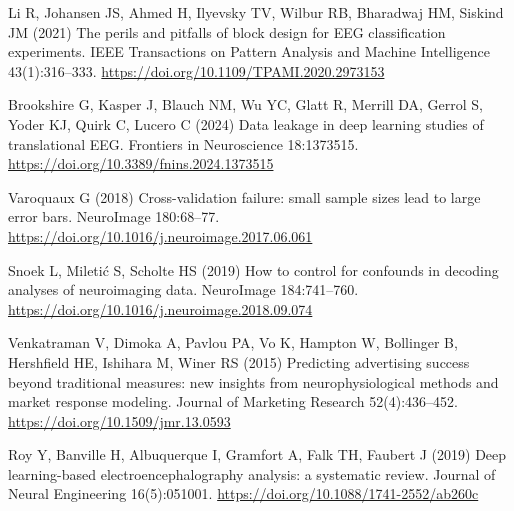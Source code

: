 
 Li R, Johansen JS, Ahmed H, Ilyevsky TV, Wilbur RB, Bharadwaj HM, Siskind JM (2021) The perils and pitfalls of block design for EEG classification experiments. IEEE Transactions on Pattern Analysis and Machine Intelligence 43(1):316--333. \url{https://doi.org/10.1109/TPAMI.2020.2973153}

 Brookshire G, Kasper J, Blauch NM, Wu YC, Glatt R, Merrill DA, Gerrol S, Yoder KJ, Quirk C, Lucero C (2024) Data leakage in deep learning studies of translational EEG. Frontiers in Neuroscience 18:1373515. \url{https://doi.org/10.3389/fnins.2024.1373515}

 Varoquaux G (2018) Cross-validation failure: small sample sizes lead to large error bars. NeuroImage 180:68--77. \url{https://doi.org/10.1016/j.neuroimage.2017.06.061}

 Snoek L, Mileti\'{c} S, Scholte HS (2019) How to control for confounds in decoding analyses of neuroimaging data. NeuroImage 184:741--760. \url{https://doi.org/10.1016/j.neuroimage.2018.09.074}

 Venkatraman V, Dimoka A, Pavlou PA, Vo K, Hampton W, Bollinger B, Hershfield HE, Ishihara M, Winer RS (2015) Predicting advertising success beyond traditional measures: new insights from neurophysiological methods and market response modeling. Journal of Marketing Research 52(4):436--452. \url{https://doi.org/10.1509/jmr.13.0593}

 Roy Y, Banville H, Albuquerque I, Gramfort A, Falk TH, Faubert J (2019) Deep learning-based electroencephalography analysis: a systematic review. Journal of Neural Engineering 16(5):051001. \url{https://doi.org/10.1088/1741-2552/ab260c}

